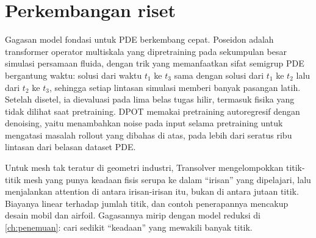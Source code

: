 \section{Perkembangan riset}

Gagasan model fondasi untuk PDE berkembang cepat. Poseidon \citep{herde2024} adalah transformer operator multiskala yang
dipretraining pada sekumpulan besar simulasi persamaan fluida, dengan trik yang memanfaatkan sifat semigrup PDE
bergantung waktu: solusi dari waktu $t_1$ ke $t_3$ sama dengan solusi dari $t_1$ ke $t_2$ lalu dari $t_2$ ke $t_3$, sehingga
setiap lintasan simulasi memberi banyak pasangan latih. Setelah disetel, ia dievaluasi pada lima belas tugas hilir,
termasuk fisika yang tidak dilihat saat pretraining. DPOT \citep{hao2024dpot} memakai pretraining autoregresif dengan
denoising, yaitu menambahkan noise pada input selama pretraining untuk mengatasi masalah rollout yang dibahas di atas,
pada lebih dari seratus ribu lintasan dari belasan dataset PDE.

Untuk mesh tak teratur di geometri industri, Transolver \citep{wu2024transolver} mengelompokkan titik-titik mesh yang
punya keadaan fisis serupa ke dalam ``irisan'' yang dipelajari, lalu menjalankan attention di antara irisan-irisan itu,
bukan di antara jutaan titik. Biayanya linear terhadap jumlah titik, dan contoh penerapannya mencakup desain mobil dan
airfoil. Gagasannya mirip dengan model reduksi di \cref{ch:penemuan}: cari sedikit ``keadaan'' yang mewakili banyak titik.

